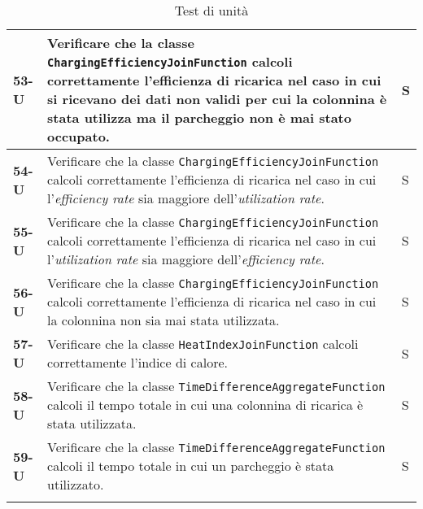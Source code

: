 \begin{longtable}{|>{\raggedright\arraybackslash}m{}|>{\raggedright\arraybackslash}m{}|>{\raggedright\arraybackslash}m{}|}
	\hline
	\textbf{53-U}   & Verificare che la classe \texttt{ChargingEfficiencyJoinFunction} calcoli correttamente l'efficienza di ricarica nel caso in cui si ricevano dei dati non validi per cui la colonnina è stata utilizza ma il parcheggio non è mai stato occupato. & S              \\
	\hline
	\textbf{54-U}   & Verificare che la classe \texttt{ChargingEfficiencyJoinFunction} calcoli correttamente l'efficienza di ricarica nel caso in cui l'\textit{efficiency rate} sia maggiore dell'\textit{utilization rate}.                                          & S              \\
	\hline
	\textbf{55-U}   & Verificare che la classe \texttt{ChargingEfficiencyJoinFunction} calcoli correttamente l'efficienza di ricarica nel caso in cui l'\textit{utilization rate} sia maggiore dell'\textit{efficiency rate}.                                          & S              \\
	\hline
	\textbf{56-U}   & Verificare che la classe \texttt{ChargingEfficiencyJoinFunction} calcoli correttamente l'efficienza di ricarica nel caso in cui la colonnina non sia mai stata utilizzata.                                                                       & S              \\
	\hline
	\textbf{57-U}   & Verificare che la classe \texttt{HeatIndexJoinFunction} calcoli correttamente l'indice di calore.                                                                                                                                                & S              \\
	\hline
	\textbf{58-U}   & Verificare che la classe \texttt{TimeDifferenceAggregateFunction} calcoli il tempo totale in cui una colonnina di ricarica è stata utilizzata.                                                                                                   & S              \\
	\hline
	\textbf{59-U}   & Verificare che la classe \texttt{TimeDifferenceAggregateFunction} calcoli il tempo totale in cui un parcheggio è stata utilizzato.                                                                                                               & S              \\
	\hline
	\caption{Test di unità}
\end{longtable}

\newpage
